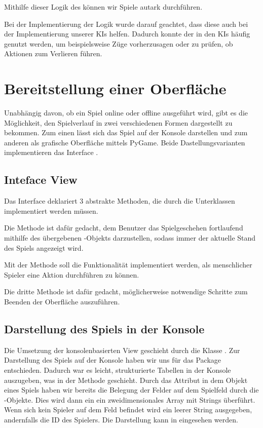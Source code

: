 Mithilfe dieser Logik des  können wir Spiele autark durchführen.

Bei der Implementierung der Logik wurde darauf geachtet, dass diese auch bei der Implementierung unserer \ac{KI}s
helfen.
Dadurch konnte der  in den \ac{KI}s häufig genutzt werden, um beispielsweise Züge vorherzusagen oder
zu prüfen, ob Aktionen zum Verlieren führen.

\section{Bereitstellung einer Oberfläche}
\label{sec:bereitstellung-oberflaeche}

Unabhängig davon, ob ein Spiel online oder offline ausgeführt wird, gibt es die Möglichkeit, den Spielverlauf in zwei
verschiedenen Formen dargestellt zu bekommen.
Zum einen lässt sich das Spiel auf der Konsole darstellen und zum anderen als grafische Oberfläche mittels PyGame.
Beide Dastellungsvarianten implementieren das Interface .

\subsection{Inteface View}
\label{subsec:interface-view}

Das Interface  deklariert 3 abstrakte Methoden, die durch die Unterklassen implementiert werden müssen.

Die Methode  ist dafür gedacht, dem Benutzer das Spielgeschehen fortlaufend mithilfe des
übergebenen -Objekts darzustellen, sodass immer der aktuelle Stand des Spiels angezeigt wird.

Mit der Methode  soll die Funktionalität implementiert werden, als menschlicher Spieler eine
Aktion durchführen zu können.

Die dritte Methode  ist dafür gedacht, möglicherweise notwendige Schritte zum Beenden der Oberfläche
auszuführen.

\subsection{Darstellung des Spiels in der Konsole}
\label{subsec:oberflaeche-konsole}

Die Umsetzung der konsolenbasierten View geschieht durch die Klasse .
Zur Darstellung des Spiels auf der Konsole haben wir uns für das Package  entschieden.
Dadurch war es leicht, strukturierte Tabellen in der Konsole auszugeben, was in der Methode 
geschieht.
Durch das Attribut  in dem Objekt eines Spiels haben wir bereits die Belegung der Felder auf dem Spielfeld
durch die -Objekte.
Dies wird dann ein ein zweidimensionales Array mit Strings überführt.
Wenn sich kein Spieler auf dem Feld befindet wird ein leerer String ausgegeben, andernfalls die ID des Spielers.
Die Darstellung kann in  eingesehen werden.\\

